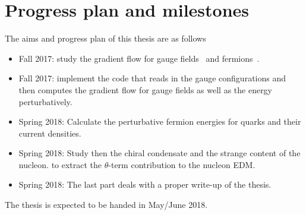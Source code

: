 \documentclass[aps,prc,twocolumn,showpacs,floatfix,nofootinbib,preprintnumbers,superscriptaddress,amsmath,amssymb]{revtex4-1}
\begin{document}
\section*{Progress plan and milestones}
The aims and progress plan of this thesis are as follows
\begin{itemize}
\item Fall 2017: study the gradient flow for gauge fields~\cite{Luscher:2010iy} and fermions~\cite{Luscher:2013cpa}.
\item Fall 2017: implement the code that reads in the gauge configurations
and then computes the gradient flow for gauge fields as well as the energy perturbatively.
\item Spring 2018: Calculate the perturbative fermion energies for quarks and their current densities.
\item Spring 2018: Study then the chiral condensate and the strange content of the nucleon.
to extract the $\theta$-term contribution to the nucleon EDM.
\item Spring 2018: The last part deals with a proper write-up of the thesis. 
\end{itemize}

The thesis is expected to be handed in May/June 2018.


%

\end{document}
